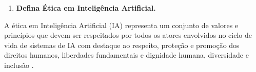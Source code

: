 \begin{enumerate}\bfseries
    \item \textbf{Defina Ética em Inteligência Artificial. }
\end{enumerate}

A ética em Inteligência Artificial (IA) representa um conjunto de valores e princípios 
que devem ser respeitados por todos os atores envolvidos no ciclo de vida de sistemas de IA 
com destaque ao respeito, proteção e promoção dos direitos humanos, liberdades fundamentais e 
dignidade humana, diversidade e inclusão \cite{unesco_ethics_ai}.